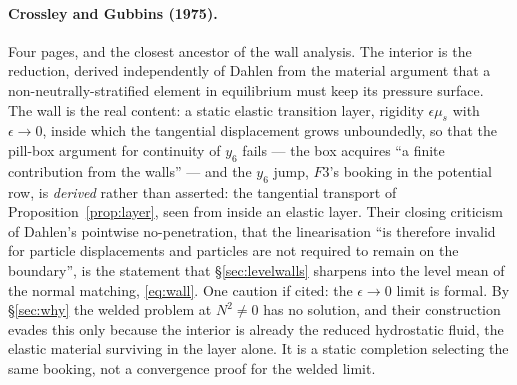 \documentclass[11pt]{article}
\theoremstyle{definition}
\theoremstyle{remark}
\begin{document}
\paragraph{Crossley and Gubbins (1975).} Four pages, and the closest
ancestor of the wall analysis. The interior is the reduction, derived
independently of Dahlen from the material argument that a
non-neutrally-stratified element in equilibrium must keep its pressure
surface. The wall is the real content: a static elastic transition
layer, rigidity $\epsilon\mu_s$ with $\epsilon \to 0$, inside which
the tangential displacement grows unboundedly, so that the pill-box
argument for continuity of $y_6$ fails --- the box acquires ``a finite
contribution from the walls'' --- and the $y_6$ jump, $F3$'s
booking in the potential row, is \emph{derived} rather than asserted:
the tangential transport of Proposition~\ref{prop:layer}, seen from
inside an elastic layer.
Their closing criticism of Dahlen's pointwise no-penetration, that the
linearisation ``is therefore invalid for particle displacements and
particles are not required to remain on the boundary'', is the
statement that \S\ref{sec:levelwalls} sharpens into the level mean of
the normal matching, \eqref{eq:wall}. One caution if cited: the $\epsilon \to 0$ limit is
formal. By \S\ref{sec:why} the welded problem at $N^2 \ne 0$ has no
solution, and their construction evades this only because the interior
is already the reduced hydrostatic fluid, the elastic material
surviving in the layer alone. It is a static completion selecting the
same booking, not a convergence proof for the welded limit.
\end{document}
